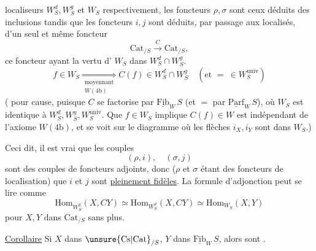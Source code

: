 localiseurs $W_S^d,W_S^g$ et $W_S$ respectivement, les foncteurs
$\rho,\sigma$ sont ceux déduits des  inclusions
tandis que les foncteurs $i,j$ sont déduits, 
par passage aux localisés, d'un seul et même
foncteur
\[
\mathrm{Cat}_{/S}\xrightarrow{C}\mathrm{Cat}_{/S},
\]
ce foncteur ayant la vertu d' $W_S$ dans
$W_S^d\cap W_S^g$.
\[
f\in W_S\underset{\substack{\text{moyennant}\\W(4\mathrm b)}}{\Longrightarrow}
 C(f)\in W_S^d\cap W_S^g\quad(\text{et }{=}\ \in W_S^{\mathrm{univ}})
\]
( pour cause, puisque $C$ se factorise par
$\underline{\mathrm{Fib}}_W\,S$ (et $=$ par $\underline{\mathrm{Parf}}_W\,S$), où $W_S$ est
identique à $W_S^d,W_S^g,W_S^{\mathrm{univ}}$. \deleted{\unsure{)}} Que $f\in W_S$ implique $C(f)\in W$ est indépendant de l'axiome
$W(4\mathrm b)$, et se voit sur le diagramme
où les flèches $i_X,i_Y$ sont dans $W_S$.)

Ceci dit, il est vrai que les  couples
\[
(\rho,i),\quad(\sigma,j)
\]
sont des couples de foncteurs adjoints, donc
($\rho$ et $\sigma$ étant des foncteurs de localisation) que $i$ et
$j$ sont \uline{pleinement fidèles}. La formule d'adjonction
peut se lire comme
\[
\boxed{\mathrm{Hom}_{W_S^g}(X,CY)\simeq\mathrm{Hom}_{W_S^d}(X,CY)
 \simeq\mathrm{Hom}_{W_S}(X,Y)}\tag*{$(*)$}
\]
pour $X,Y$ dans $\mathrm{Cat}_{/S}$ sans plus.

\uline{Corollaire} Si $X$ dans $\unsure{\mathrm{Cs}|\mathrm{Cat}}_{/S}$, $Y$ dans $\underline{\mathrm{Fib}}_W\,S$, alors
sont .

